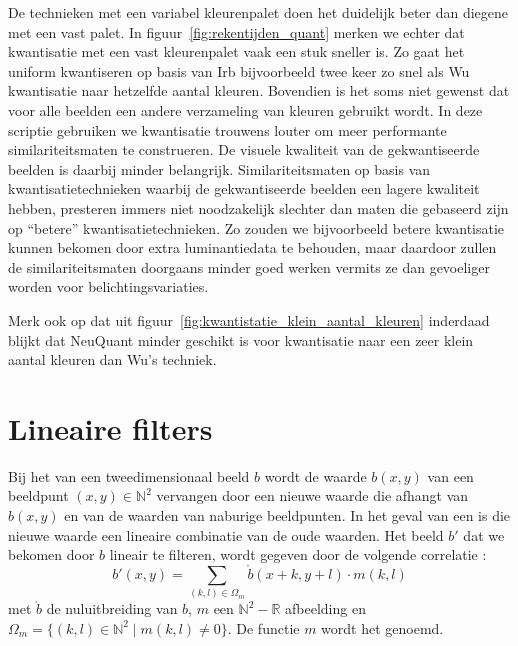 De technieken met een variabel kleurenpalet doen het duidelijk beter dan diegene met een vast palet. 
In figuur~\ref{fig:rekentijden_quant} merken we echter dat kwantisatie met een vast kleurenpalet 
vaak een stuk sneller is. Zo gaat het uniform kwantiseren op basis van Irb bijvoorbeeld
twee keer zo snel als Wu kwantisatie naar hetzelfde aantal kleuren. Bovendien is het soms niet
gewenst dat voor alle beelden een andere verzameling van kleuren gebruikt wordt. In deze scriptie gebruiken
we kwantisatie trouwens louter om meer performante similariteitsmaten te construeren. De visuele kwaliteit
van de gekwantiseerde beelden is daarbij minder belangrijk. Similariteitsmaten op basis van kwantisatietechnieken 
waarbij de gekwantiseerde beelden een lagere kwaliteit hebben, presteren immers niet noodzakelijk
slechter dan maten die gebaseerd zijn op ``betere'' kwantisatietechnieken. Zo zouden we bijvoorbeeld 
betere kwantisatie kunnen bekomen door extra luminantiedata te behouden, maar daardoor zullen
de similariteitsmaten doorgaans minder goed werken vermits ze dan gevoeliger worden voor 
belichtingsvariaties.

Merk ook op dat uit figuur~\ref{fig:kwantistatie_klein_aantal_kleuren} inderdaad blijkt
dat NeuQuant minder geschikt is voor kwantisatie naar een zeer klein
aantal kleuren dan Wu's techniek. 

\section{Lineaire filters}
\label{sectie:lineaire_filters}

Bij het  van een tweedimensionaal beeld $b$ wordt de waarde $b(x,y)$ van een 
beeldpunt $(x,y) \in \mathbb{N}^2$ vervangen door een nieuwe waarde die afhangt van $b(x,y)$ 
en van de waarden van naburige beeldpunten. In het geval van een  is die nieuwe waarde een lineaire combinatie 
van de oude waarden. Het beeld $b'$ dat we bekomen door $b$ lineair te filteren, wordt gegeven door
de volgende correlatie \cite{philips:beeldverwerking}:
\begin{displaymath}
b'(x,y) = \sum_{(k,l) \in \Omega_m} \mathring{b}(x+k,y+l) \cdot m(k,l)
\end{displaymath}
met $\mathring{b}$ de nuluitbreiding van $b$, $m$ een $\mathbb{N}^2 - \mathbb{R}$ afbeelding 
en $\Omega_m = \{ (k,l) \in \mathbb{N}^2 \mid m(k,l) \ne 0 \}$. 
De functie $m$ wordt het  genoemd.

